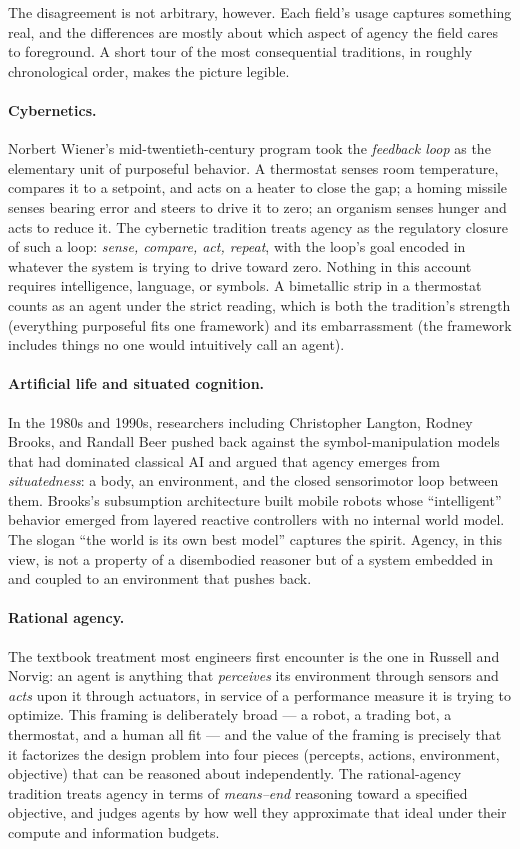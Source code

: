 The disagreement is not arbitrary, however. Each field's usage
captures something real, and the differences are mostly about
which aspect of agency the field cares to foreground. A short
tour of the most consequential traditions, in roughly
chronological order, makes the picture legible.

\paragraph{Cybernetics.}
Norbert Wiener's mid-twentieth-century program took the
\emph{feedback loop} as the elementary unit of purposeful
behavior. A thermostat senses room temperature, compares it to a
setpoint, and acts on a heater to close the gap; a homing missile
senses bearing error and steers to drive it to zero; an organism
senses hunger and acts to reduce it. The cybernetic tradition
treats agency as the regulatory closure of such a loop:
\emph{sense, compare, act, repeat}, with the loop's goal encoded
in whatever the system is trying to drive toward zero. Nothing in
this account requires intelligence, language, or symbols. A
bimetallic strip in a thermostat counts as an agent under the
strict reading, which is both the tradition's strength
(everything purposeful fits one framework) and its embarrassment
(the framework includes things no one would intuitively call an
agent).

\paragraph{Artificial life and situated cognition.}
In the 1980s and 1990s, researchers including Christopher
Langton, Rodney Brooks, and Randall Beer pushed back against the
symbol-manipulation models that had dominated classical AI and
argued that agency emerges from \emph{situatedness}: a body, an
environment, and the closed sensorimotor loop between them.
Brooks's subsumption architecture built mobile robots whose
``intelligent'' behavior emerged from layered reactive
controllers with no internal world model. The slogan ``the world
is its own best model'' captures the spirit. Agency, in this
view, is not a property of a disembodied reasoner but of a
system embedded in and coupled to an environment that pushes back.

\paragraph{Rational agency.}
The textbook treatment most engineers first encounter is the one
in Russell and Norvig: an agent is anything that \emph{perceives}
its environment through sensors and \emph{acts} upon it through
actuators, in service of a performance measure it is trying to
optimize. This framing is deliberately broad --- a robot, a
trading bot, a thermostat, and a human all fit --- and the value
of the framing is precisely that it factorizes the design problem
into four pieces (percepts, actions, environment, objective) that
can be reasoned about independently. The rational-agency tradition
treats agency in terms of \emph{means--end} reasoning toward a
specified objective, and judges agents by how well they
approximate that ideal under their compute and information
budgets.

